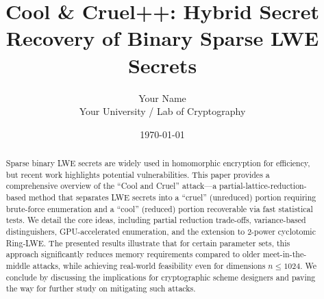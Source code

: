 \documentclass[11pt]{article}
\title{Cool \& Cruel++: Hybrid Secret Recovery of Binary Sparse LWE Secrets}
\author{Your Name \\ \small{Your University / Lab of Cryptography}}
\date{\today}
\begin{document}
\maketitle

\begin{abstract}
Sparse binary LWE secrets are widely used in homomorphic encryption for efficiency, but recent work highlights potential vulnerabilities. This paper provides a comprehensive overview of the ``Cool and Cruel'' attack---a partial-lattice-reduction-based method that separates LWE secrets into a ``cruel'' (unreduced) portion requiring brute-force enumeration and a ``cool'' (reduced) portion recoverable via fast statistical tests. We detail the core ideas, including partial reduction trade-offs, variance-based distinguishers, GPU-accelerated enumeration, and the extension to 2-power cyclotomic Ring-LWE. The presented results illustrate that for certain parameter sets, this approach significantly reduces memory requirements compared to older meet-in-the-middle attacks, while achieving real-world feasibility even for dimensions $n \leq 1024$. We conclude by discussing the implications for cryptographic scheme designers and paving the way for further study on mitigating such attacks.
\end{abstract}
\end{document}

